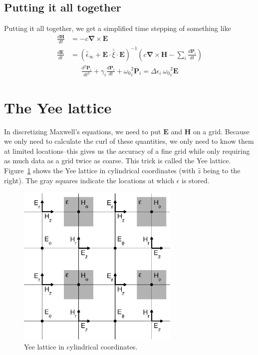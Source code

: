 \documentclass[floats]{book}
\begin{document}
\subsection{Putting it all together}

Putting it all together, we get a simplified time stepping of something
like
\begin{align}
\frac{d\mathbf H}{dt} &= -c \mathbf \nabla \times \mathbf E\\
\frac{d\mathbf E}{dt} &= \left( \bar{\bar{\epsilon}}_\infty +
                                \mathbf E \cdot \bar{\bar \xi} \cdot \mathbf E
                         \right)^{-1}
  \left(
  c \mathbf \nabla \times \mathbf H
  - \sum_i \frac{d\mathbf P_i}{dt}
  \right)
\end{align}
\begin{align}
\frac{d^2\mathbf{P}_i}{dt^2} + \gamma_i \frac{d\mathbf{P}_i}{dt}
+ {\omega_0}_i^2 \mathbf{P}_i = \Delta\epsilon_i\ {\omega_0}_i^2 \mathbf{E}
\end{align}

\section{The Yee lattice}

In discretizing Maxwell's equations, we need to put $\mathbf E$ and
$\mathbf H$ on a grid.  Because we only need to calculate the curl of these
quantities, we only need to know them at limited locations--this gives us
the accuracy of a fine grid while only requiring as much data as a grid
twice as coarse.  This trick is called the Yee lattice.
Figure~\ref{yee_fig} shows the Yee lattice in cylindrical coordinates (with
$\hat z$ being to the right).  The gray squares indicate the locations at
which $\epsilon$ is stored.

\begin{figure}
\caption{Yee lattice in cylindrical coordinates.
\label{yee_fig}}
\centering
\includegraphics[width=7.8cm,clip=true]{Yee_bulk}
\end{figure}
\end{document}
